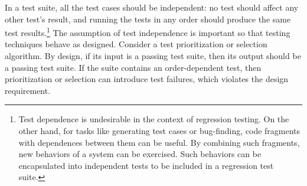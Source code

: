 In a test suite, all the test cases should be independent:
no test should affect any other test's result, and
running the tests in any order should produce the same test results.\footnote{Test dependence is
undesirable in the context of regression testing.  On the other hand, for
tasks like generating test cases or bug-finding, code fragments with
dependences between them can be useful.  By combining such fragments, new
behaviors of a system can be exercised.  Such behaviors can be encapsulated
into independent tests to be included in a regression test suite.}
The assumption of test independence 
is important so that testing techniques behave
as designed.
Consider a test prioritization or selection algorithm.  By design, if its
input is a passing test suite, then its output should be a passing test
suite.  If the suite contains an order-dependent test, then prioritization
or selection can introduce test failures, which violates the design
requirement.

